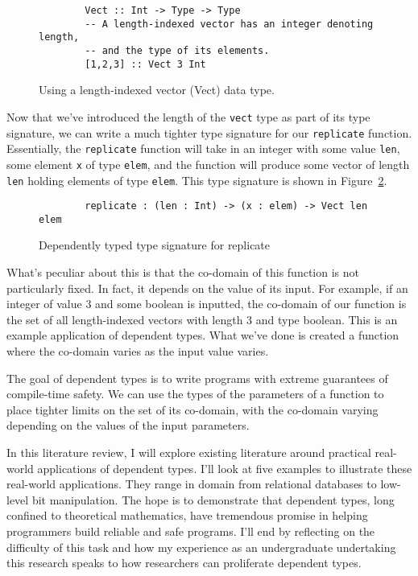 \begin{figure}[ht!!!]
    \caption{Using a length-indexed vector (Vect) data type.}
    \label{vect}
    \begin{lstlisting}
        Vect :: Int -> Type -> Type 
        -- A length-indexed vector has an integer denoting length, 
        -- and the type of its elements. 
        [1,2,3] :: Vect 3 Int
    \end{lstlisting}
\end{figure} 


Now that we've introduced the length of the \texttt{vect} type as part of its
type signature, we can write a much tighter type signature for our
\texttt{replicate} function. Essentially, the \texttt{replicate} function will
take in an integer with some value \texttt{len}, some element \texttt{x} of type
\texttt{elem}, and the function will produce some vector of length \texttt{len}
holding elements of type \texttt{elem}. This type signature is shown in
Figure~\ref{dtvect}. 

\begin{figure}
    \caption{Dependently typed type signature for replicate}
    \label{dtvect}
    \begin{lstlisting}
        replicate : (len : Int) -> (x : elem) -> Vect len elem
    \end{lstlisting}
\end{figure} 

What's peculiar about this is that the co-domain of this function is not
particularly fixed. In fact, it depends on the value of its input. For example,
if an integer of value 3 and some boolean is inputted, the co-domain of our
function is the set of all length-indexed vectors with length 3 and type
boolean. This is an example application of dependent types. What we've done is
created a function where the co-domain varies as the input value varies. 

The goal of dependent types is to write programs with extreme guarantees of
compile-time safety. We can use the types of the parameters of a function to
place tighter limits on the set of its co-domain, with the co-domain varying
depending on the values of the input parameters. 

In this literature review, I will explore existing literature around practical
real-world applications of dependent types. I'll look at five examples to
illustrate these real-world applications. They range in domain from relational
databases to low-level bit manipulation. The hope is to demonstrate that
dependent types, long confined to theoretical mathematics, have tremendous
promise in helping programmers build reliable and safe programs. I'll end by
reflecting on the difficulty of this task and how my experience as an
undergraduate undertaking this research speaks to how researchers can
proliferate dependent types.